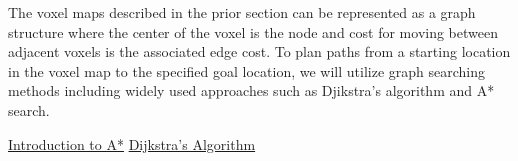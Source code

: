 The voxel maps described in the prior section can be represented as a graph structure where the center of the voxel is the node and cost for moving between adjacent voxels is the associated edge cost. To plan paths from a starting location in the voxel map to the specified goal location, we will utilize graph searching methods including widely used approaches such as Djikstra's algorithm and A* search.

\vspace{1.0in}


\href{https://www.redblobgames.com/pathfinding/a-star/introduction.html}{Introduction to A*}
\href{https://brilliant.org/wiki/dijkstras-short-path-finder/}{Dijkstra's Algorithm}




